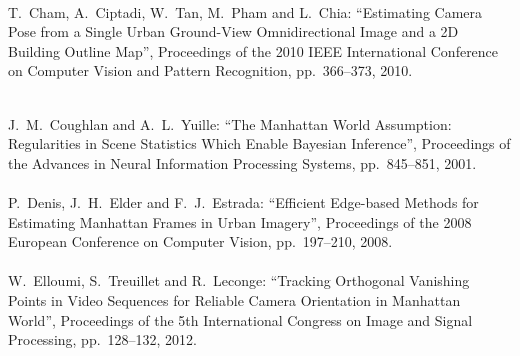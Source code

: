 \begin{mythebibliography}{}
\leavevmode \\T.~Cham, A.~Ciptadi, W.~Tan, M.~Pham and L.~Chia:
\newblock ``Estimating Camera Pose from a Single Urban Ground-View Omnidirectional Image and a 2D Building Outline Map'',
\newblock Proceedings of the 2010 IEEE International Conference on Computer Vision and Pattern Recognition, pp.~366--373, 2010.
\\


\newpage

\leavevmode \\J.~M.~Coughlan and A.~L.~Yuille:
\newblock ``The Manhattan World Assumption: Regularities in Scene Statistics Which Enable Bayesian Inference'',
\newblock Proceedings of the Advances in Neural Information Processing Systems, pp.~845--851, 2001.
\\


\leavevmode \\P.~Denis, J.~H.~Elder and F.~J.~Estrada:
\newblock ``Efficient Edge-based Methods for Estimating Manhattan Frames in Urban Imagery'',
\newblock Proceedings of the 2008 European Conference on Computer Vision, pp.~197--210, 2008.
\\

\leavevmode \\W.~Elloumi, S.~Treuillet and R.~Leconge:
\newblock ``Tracking Orthogonal Vanishing Points in Video Sequences for Reliable Camera Orientation in Manhattan World'',
\newblock Proceedings of the 5th International Congress on Image and Signal Processing, pp.~128--132, 2012.
\\


\end{mythebibliography}

